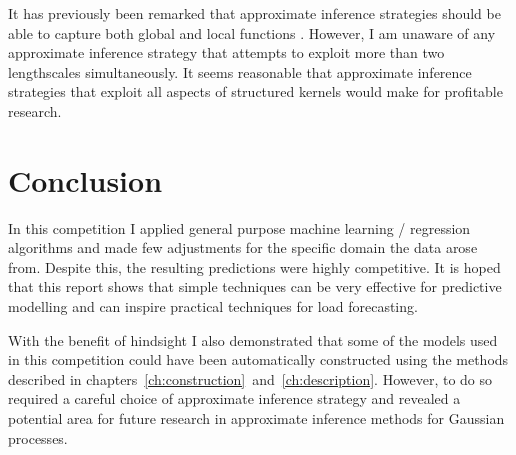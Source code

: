 It has previously been remarked that approximate inference strategies should be able to capture both global and local functions \citep[e.g.][]{Snelson2007-mj, Vanhatalo2012-yr}.
However, I am unaware of any approximate inference strategy that attempts to exploit more than two lengthscales simultaneously.
It seems reasonable that approximate inference strategies that exploit all aspects of structured kernels would make for profitable research.

\section{Conclusion}

In this competition I applied general purpose machine learning / regression algorithms and made few adjustments for the specific domain the data arose from.
Despite this, the resulting predictions were highly competitive.
It is hoped that this report shows that simple techniques can be very effective for predictive modelling and can inspire practical techniques for load forecasting.

With the benefit of hindsight I also demonstrated that some of the models used in this competition could have been automatically constructed using the methods described in chapters~\ref{ch:construction}~and~\ref{ch:description}.
However, to do so required a careful choice of approximate inference strategy and revealed a potential area for future research in approximate inference methods for Gaussian processes.

% 
% 
